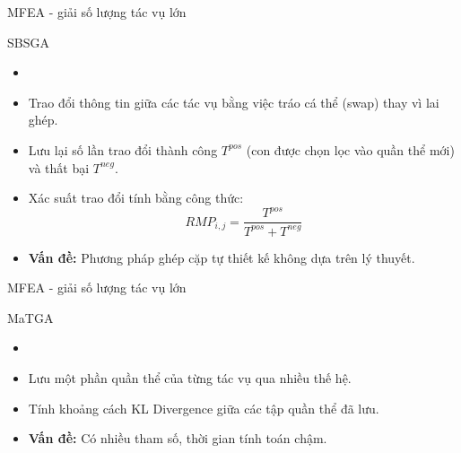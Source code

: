 \begin{frame}{MFEA - giải số lượng tác vụ lớn}
    \begin{block}{SBSGA}
        \begin{itemize}
            \item {}
            \item Trao đổi thông tin giữa các tác vụ bằng việc tráo cá thể (swap) thay vì lai ghép.
            \item Lưu lại số lần trao đổi thành công $T^{pos}$ (con được chọn lọc vào quần thể mới) và thất bại $T^{neg}$.
            \item Xác suất trao đổi tính bằng công thức: 
                \begin{equation}
                    RMP_{i, j} = \frac{T^{pos}}{T^{pos} + T^{neg}}
                \end{equation}
            \item \textbf{Vấn đề:} Phương pháp ghép cặp tự thiết kế không dựa trên lý thuyết.
        \end{itemize}
    \end{block}
\end{frame}

\begin{frame}{MFEA - giải số lượng tác vụ lớn}
    \begin{block}{MaTGA}
        \begin{itemize}
            \item {}
            \item Lưu một phần quần thể của từng tác vụ qua nhiều thế hệ.
            \item Tính khoảng cách KL Divergence giữa các tập quần thể đã lưu.
            \item \textbf{Vấn đề:} Có nhiều tham số, thời gian tính toán chậm.
        \end{itemize}
    \end{block}
\end{frame}
